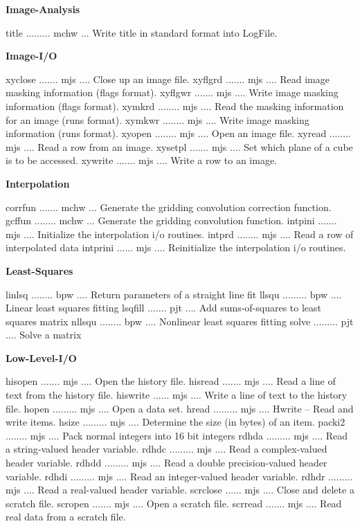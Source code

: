 \par\centerline{\bf Image-Analysis}
{\eightpoint\begintt
title ......... mchw ... Write title in standard format into LogFile.
\endtt}
\par\centerline{\bf Image-I/O}
{\eightpoint\begintt
xyclose ....... mjs .... Close up an image file.
xyflgrd ....... mjs .... Read image masking information (flags format).
xyflgwr ....... mjs .... Write image masking information (flags format).
xymkrd ........ mjs .... Read the masking information for an image (runs format).
xymkwr ........ mjs .... Write image masking information (runs format).
\endtt}
{\eightpoint\begintt
xyopen ........ mjs .... Open an image file.
xyread ........ mjs .... Read a row from an image.
xysetpl ....... mjs .... Set which plane of a cube is to be accessed.
xywrite ....... mjs .... Write a row to an image.
\endtt}
\par\centerline{\bf Interpolation}
{\eightpoint\begintt
corrfun ....... mchw ... Generate the gridding convolution correction function.
gcffun ........ mchw ... Generate the gridding convolution function.
intpini ....... mjs .... Initialize the interpolation i/o routines.
intprd ........ mjs .... Read a row of interpolated data
intprini ...... mjs .... Reinitialize the interpolation i/o routines.
\endtt}
\par\centerline{\bf Least-Squares}
{\eightpoint\begintt
linlsq ........ bpw .... Return parameters of a straight line fit
llsqu ......... bpw .... Linear least squares fitting
lsqfill ....... pjt .... Add sums-of-squares to least squares matrix
nllsqu ........ bpw .... Nonlinear least squares fitting
solve ......... pjt .... Solve a matrix
\endtt}
\par\centerline{\bf Low-Level-I/O}
{\eightpoint\begintt
hisopen ....... mjs .... Open the history file.
hisread ....... mjs .... Read a line of text from the history file.
hiswrite ...... mjs .... Write a line of text to the history file.
hopen ......... mjs .... Open a data set.
hread ......... mjs .... Hwrite -- Read and write items.
\endtt}
{\eightpoint\begintt
hsize ......... mjs .... Determine the size (in bytes) of an item.
packi2 ........ mjs .... Pack normal integers into 16 bit integers
rdhda ......... mjs .... Read a string-valued header variable.
rdhdc ......... mjs .... Read a complex-valued header variable.
rdhdd ......... mjs .... Read a double precision-valued header variable.
\endtt}
{\eightpoint\begintt
rdhdi ......... mjs .... Read an integer-valued header variable.
rdhdr ......... mjs .... Read a real-valued header variable.
scrclose ...... mjs .... Close and delete a scratch file.
scropen ....... mjs .... Open a scratch file.
scrread ....... mjs .... Read real data from a scratch file.
\endtt}
